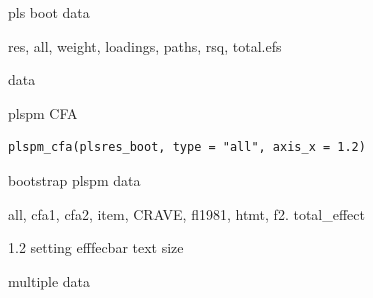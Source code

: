 \documentclass[a4paper]{book}
\begin{document}
%
\begin{Arguments}
\begin{ldescription}
\item[\code{pls\_boot}] pls boot data

\item[\code{type}] res, all, weight, loadings, paths, rsq, total.efs
\end{ldescription}
\end{Arguments}
%
\begin{Value}
data
\end{Value}
%
\begin{Examples}
\end{Examples}
%
\begin{Description}
plspm CFA
\end{Description}
%
\begin{Usage}
\begin{verbatim}
plspm_cfa(plsres_boot, type = "all", axis_x = 1.2)
\end{verbatim}
\end{Usage}
%
\begin{Arguments}
\begin{ldescription}
\item[\code{plsres\_boot}] bootstrap plspm data

\item[\code{type}] all, cfa1, cfa2, item, CRAVE, fl1981, htmt, f2. total\_effect

\item[\code{axis\_x}] 1.2 setting efffecbar text size
\end{ldescription}
\end{Arguments}
%
\begin{Value}
multiple data
\end{Value}
%
\end{document}

